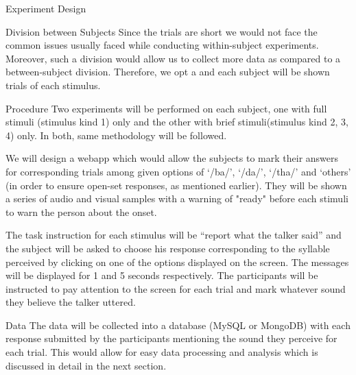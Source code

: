 \documentclass{article}
\begin{document}
\begin{psection}{Experiment Design}
	\begin{psubsection}{Division between Subjects}
		Since the trials are short we would not face the common issues usually faced while conducting within-subject experiments. Moreover, such a division would allow us to collect more data as compared to a between-subject division. Therefore, we opt a  and each subject will be shown trials of each stimulus.
	\end{psubsection}

	\begin{psubsection}{Procedure}
		Two experiments will be performed on each subject, one with full stimuli (stimulus kind 1) only and the other with brief stimuli(stimulus kind 2, 3, 4) only. In both, same methodology will be followed.

		We will design a webapp which would allow the subjects to mark their answers for corresponding trials among given options of `/ba/', `/da/', `/tha/' and `others' (in order to ensure open-set responses, as mentioned earlier). They will be shown a series of audio and visual samples with a warning of "ready" before each stimuli to warn the person about the onset.

		The task instruction for each stimulus will be ``report what the talker said'' and the subject will be asked to choose his response corresponding to the syllable perceived by clicking on one of the options displayed on the screen. The messages will be displayed for 1 and 5 seconds respectively. The participants will be instructed to pay attention to the screen for each trial and mark whatever sound they believe the talker uttered.
	\end{psubsection}

	\begin{psubsection}{Data}
		The data will be collected into a database (MySQL or MongoDB) with each response submitted by the participants mentioning the sound they perceive for each trial. This would allow for easy data processing and analysis which is discussed in detail in the next section.
	\end{psubsection}
\end{psection}
\end{document}
